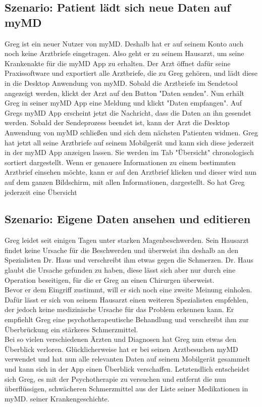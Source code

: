 \documentclass[a4paper]{scrreprt}
\begin{document}
\subsection{Szenario: Patient lädt sich neue Daten auf myMD}
Greg ist ein neuer Nutzer von myMD. Deshalb hat er auf seinem Konto auch noch keine Arztbriefe eingetragen. Also geht er zu seinem Hausarzt, um seine Krankenakte für die myMD \gls{App} zu erhalten. Der Arzt öffnet dafür seine Praxissoftware und exportiert alle Arztbriefe, die zu Greg gehören, und lädt diese in die \gls{Desktop Anwendung} von myMD. Sobald die Arztbriefe im Sendetool angezeigt werden, klickt der Arzt auf den Button "Daten senden". Nun erhält Greg in seiner myMD \gls{App} eine Meldung und klickt "Daten empfangen". Auf Gregs myMD \gls{App} erscheint jetzt die Nachricht, dass die Daten an ihn gesendet werden. Sobald der Sendeprozess beendet ist, kann der Arzt die \gls{Desktop Anwendung} von myMD schließen und sich dem nächsten Patienten widmen. Greg hat jetzt all seine Arztbriefe auf seinem Mobilgerät und kann sich diese jederzeit in der myMD \gls{App} anzeigen lassen. Sie werden im \gls{Tab} "Übersicht" chronologisch sortiert dargestellt. Wenn er genauere Informationen zu einem bestimmten Arztbrief einsehen möchte, kann er auf den Arztbrief klicken und dieser wird nun auf dem ganzen Bildschirm, mit allen Informationen, dargestellt. So hat Greg jederzeit eine Übersicht

\subsection{Szenario: Eigene Daten ansehen und editieren}
Greg leidet seit einigen Tagen unter starken Magenbeschwerden. Sein Hausarzt findet keine Ursache für die Beschwerden und überweist ihn deshalb an den Spezialisten Dr. Haus und verschreibt ihm etwas gegen die Schmerzen. Dr. Haus glaubt die Ursache gefunden zu haben, diese lässt sich aber nur durch eine Operation beseitigen, für die er Greg an einen Chirurgen überweist. \\
Bevor er dem Eingriff zustimmt, will er sich noch eine zweite Meinung einholen. Dafür lässt er sich von seinem Hausarzt einen weiteren Spezialisten empfehlen, der jedoch keine medizinische Ursache für das Problem erkennen kann. Er empfiehlt Greg eine psychotherapeutische Behandlung und verschreibt ihm zur Überbrückung ein stärkeres Schmerzmittel. \\ 
Bei so vielen verschiedenen Ärzten und Diagnosen hat Greg nun etwas den Überblick verloren. Glücklicherweise hat er bei seinen Arztbesuchen myMD verwendet und hat nun alle relevanten Daten auf seinem Mobilgerät gesammelt und kann sich in der App einen Überblick verschaffen. Letztendlich entscheidet sich Greg, es mit der Psychotherapie zu versuchen und entfernt die nun überflüssigen, schwächeren Schmerzmittel aus der Liste seiner Medikationen in myMD. seiner Krankengeschichte.
\end{document}
